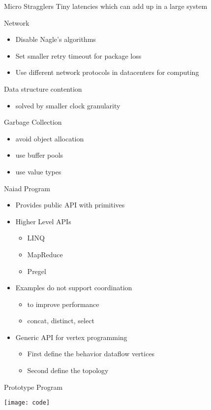  \begin{frame}[t]{Micro Stragglers}
  \vspace{0.15cm}
  Tiny latencies which can add up in a large system
 
  \vspace{0.25cm}
  Network
  \begin{itemize}\setlength\itemsep{0.15cm}
    \item Disable Nagle's algorithms
    \item Set smaller retry timeout for package loss
    \item Use different network protocols in datacenters for computing
  \end{itemize}

  \vspace{0.25cm}
  Data structure contention
  \begin{itemize}
    \item solved by smaller clock granularity
  \end{itemize}

  \vspace{0.25cm}
  Garbage Collection
  \begin{itemize}\setlength\itemsep{0.15cm}
    \item avoid object allocation
    \item use buffer pools
    \item use value types
  \end{itemize}

\end{frame}

 \begin{frame}[t]{Naiad Program}
    \vspace{0.15cm}
    \begin{itemize}\setlength\itemsep{0.25cm}
     \item Provides public API with primitives
     \item Higher Level APIs
     \begin{itemize}\setlength\itemsep{0.25cm}
      \item LINQ
      \item MapReduce
      \item Pregel
     \end{itemize}
     \item Examples do not support coordination
     \begin{itemize}\setlength\itemsep{0.25cm}
     \item to improve performance
     \item concat, distinct, select
     \end{itemize}
     \item Generic API for vertex programming
     \begin{itemize}\setlength\itemsep{0.25cm}
     \item First define the behavior dataflow vertices
     \item Second define the topology
     \end{itemize}
   \end{itemize}

\end{frame}

\begin{frame}[t]{Prototype Program}

\begin{center}
  \texttt{[image: code]}
\end{center}

\end{frame}
